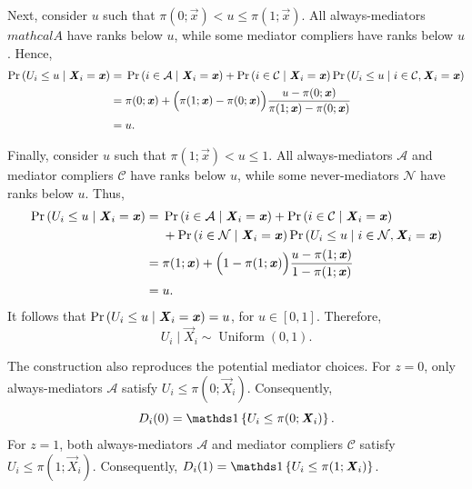 Next, consider $u$ such that $\pi(0;\vec x)
    <
    u
    \leq
    \pi(1;\vec x)$.
All always-mediators $mathcal A$ have ranks below $u$, while some mediator compliers have ranks below $u$.
Hence,
\[
    \begin{aligned}
    \Pr\left( 
        U_i\leq u
        \mid
        \boldsymbol{\mathit{X}}_i=\boldsymbol{\mathit{x}}
     \right)
    ={}&
    \Pr\left( 
        i \in \mathcal A
        \mid
        \boldsymbol{\mathit{X}}_i=\boldsymbol{\mathit{x}}
     \right)
    +
    \Pr\left( 
        i \in \mathcal C
        \mid
        \boldsymbol{\mathit{X}}_i=\boldsymbol{\mathit{x}}
     \right)
    \Pr\left( 
        U_i\leq u
        \mid
        i \in \mathcal C,\boldsymbol{\mathit{X}}_i=\boldsymbol{\mathit{x}}
     \right)
    \\
    ={}&
    \pi(0;\boldsymbol{\mathit{x}})
    +
    \Big(
        \pi(1;\boldsymbol{\mathit{x}})-\pi(0;\boldsymbol{\mathit{x}})
    \Big)
    \frac{
        u-\pi(0;\boldsymbol{\mathit{x}})
    }{
        \pi(1;\boldsymbol{\mathit{x}})-\pi(0;\boldsymbol{\mathit{x}})
    }
    \\
    ={}&
    u.
    \end{aligned}
\]

Finally, consider $u$ such that
$    \pi(1;\vec x)
    <
    u
    \leq
    1$.
All always-mediators $\mathcal A$ and mediator compliers $\mathcal C$ have ranks below $u$, while some never-mediators $\mathcal N$ have ranks below $u$.
Thus,
\[
    \begin{aligned}
    \Pr\left( 
        U_i\leq u
        \mid
        \boldsymbol{\mathit{X}}_i=\boldsymbol{\mathit{x}}
     \right)
    ={}&
    \Pr\left( 
        i \in \mathcal A
        \mid
        \boldsymbol{\mathit{X}}_i=\boldsymbol{\mathit{x}}
     \right)
    +
    \Pr\left( 
        i \in \mathcal C
        \mid
        \boldsymbol{\mathit{X}}_i=\boldsymbol{\mathit{x}}
     \right)
    \\
    &+
    \Pr\left( 
        i \in \mathcal N
        \mid
        \boldsymbol{\mathit{X}}_i=\boldsymbol{\mathit{x}}
     \right)
    \Pr\left( 
        U_i\leq u
        \mid
        i \in \mathcal N,\boldsymbol{\mathit{X}}_i=\boldsymbol{\mathit{x}}
     \right)
    \\
    ={}&
    \pi(1;\boldsymbol{\mathit{x}}) + 
    \Big(
        1-\pi(1;\boldsymbol{\mathit{x}})
    \Big)
    \frac{
        u-\pi(1;\boldsymbol{\mathit{x}})
    }{
        1-\pi(1;\boldsymbol{\mathit{x}})
    }
    \\
    ={}&
    u.
    \end{aligned}
    \label{eqn:appendix-uniform-proof-never}
\]
It follows that
$    \Pr\left( 
        U_i\leq u
        \mid
        \boldsymbol{\mathit{X}}_i=\boldsymbol{\mathit{x}}
     \right)
    =
    u$, for
    $u\in[0,1]$.
Therefore,
\[
    U_i
    \mid
    \vec X_i
    \sim
    \operatorname{Uniform}(0,1).
    \label{eqn:appendix-uniform-rank-result}
\]

The construction also reproduces the potential mediator choices.
For $z=0$, only always-mediators $\mathcal A$ satisfy
$    U_i
    \leq
    \pi(0;\vec X_i)$.
Consequently,
\[
    D_i(0)
    =
    \indicator{
        U_i
        \leq
        \pi(0;\vec X_i)
    }.
    \label{eqn:appendix-threshold-z0}
\]
For $z=1$, both always-mediators $\mathcal A$ and mediator compliers $\mathcal C$ satisfy
$    U_i
    \leq
    \pi(1;\vec X_i)$.
Consequently,
$    D_i(1)
    =
    \indicator{
        U_i
        \leq
        \pi(1;\vec X_i)
    }$.

